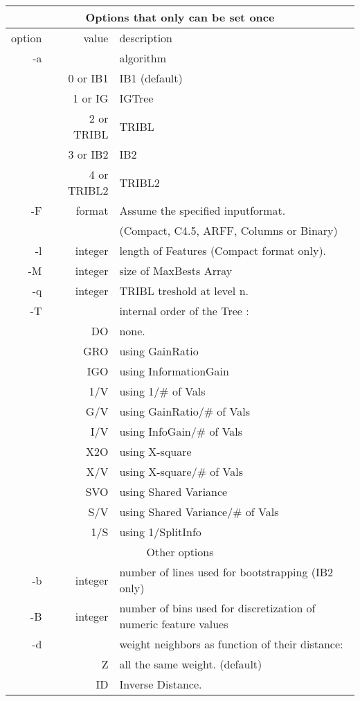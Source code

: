 \documentclass{article}
\begin{document}
\begin{tabular}{|r|r|l|}
\hline
\multicolumn{3}{|c|}{Options that only can be set {\bf once}}\\
\hline
option & value & description \\
\hline
-a &    & algorithm \\
   & 0 or IB1   & IB1     (default)\\
   & 1 or IG    & IGTree \\
   & 2 or TRIBL & TRIBL \\
   & 3 or IB2   & IB2 \\
   & 4 or TRIBL2 & TRIBL2 \\
-F & format & Assume the specified inputformat. \\
 & &     (Compact, C4.5, ARFF, Columns or Binary) \\
-l & integer & length of Features (Compact format only). \\
-M & integer & size of MaxBests Array \\
-q & integer & TRIBL treshold at level n. \\
-T &     & internal order of the Tree : \\
   & DO  & none. \\
   & GRO & using GainRatio \\
   & IGO & using InformationGain \\
   & 1/V & using 1/\# of Vals \\
   & G/V & using GainRatio/\# of Vals \\
   & I/V & using InfoGain/\# of Vals \\
   & X2O & using X-square \\
   & X/V & using X-square/\# of Vals \\
   & SVO & using Shared Variance \\
   & S/V & using Shared Variance/\# of Vals \\
   & 1/S & using 1/SplitInfo \\
\hline
\multicolumn{3}{|c|}{Other options}\ \\
\hline
-b & integer  & number of lines used for bootstrapping (IB2 only)\\
-B & integer  & number of bins used for discretization of numeric feature values\\
-d &     & weight neighbors as function of their distance: \\
   &  Z  & all the same weight. (default) \\
   & ID  & Inverse Distance. \\

\end{tabular}
\end{document}
